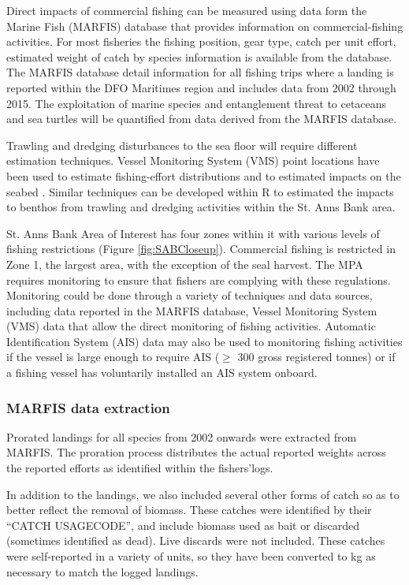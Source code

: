 \documentclass[letterpaper,portrait,11pt]{scrartcl}
\numberwithin{equation}{section}		%
\numberwithin{figure}{section}		%
\numberwithin{table}{section}				%
\begin{document}
Direct impacts of commercial fishing can be measured using data form the Marine Fish (MARFIS) database that provides information on commercial-fishing activities.  For most fisheries the fishing position, gear type, catch per unit effort, estimated weight of catch by species information is available from the database. The MARFIS database detail information for all fishing trips where a landing is reported within the DFO Maritimes region and includes data from 2002 through 2015. The exploitation of marine species and entanglement threat to cetaceans and sea turtles will be quantified from data derived from the MARFIS database.
   

Trawling and dredging disturbances to the sea floor will require different estimation techniques.  Vessel Monitoring System (VMS) point locations have been used to estimate fishing-effort distributions \parencites[e.g., ][]{lee2010developing} and to estimated impacts on the seabed \parencite{gerritsen2013much}.  Similar techniques can be developed within R to estimated the impacts to benthos from trawling and dredging activities within the St. Anns Bank area.   


St. Anns Bank Area of Interest has four zones within it with various levels of fishing restrictions (Figure \ref{fig:SABCloseup}). Commercial fishing is restricted in Zone 1, the largest area, with the exception of the seal harvest.  The MPA requires monitoring to ensure that fishers are complying with these regulations.  Monitoring could be done through a variety of techniques and data sources, including data reported in the MARFIS database, Vessel Monitoring System (VMS) data that allow the direct monitoring of fishing activities. Automatic Identification System (AIS) data may also be used to monitoring fishing activities if the vessel is large enough to require AIS ($\geq$ 300 gross registered tonnes) or if a fishing vessel has voluntarily installed an AIS system onboard.  


\subsubsection{MARFIS data extraction}

Prorated landings for all species from 2002 onwards were extracted from MARFIS. The proration process distributes the actual reported weights across the reported efforts as identified within the fishers\textquoteright logs.  

In addition to the landings, we also included several other forms of catch so as to better reflect the removal of biomass. These catches were identified by their \textquotedblleft CATCH \textunderscore USAGE\textunderscore CODE\textquotedblright, and include biomass used as bait or discarded (sometimes identified as dead).  Live discards were not included.  These catches were self-reported in a variety of units, so they have been converted to kg as necessary to match the logged landings. 
\end{document}

